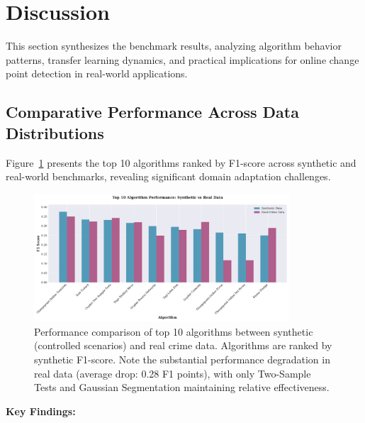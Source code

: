 \section{Discussion}

This section synthesizes the benchmark results, analyzing algorithm behavior patterns, transfer learning dynamics, and practical implications for online change point detection in real-world applications.

\subsection{Comparative Performance Across Data Distributions}

Figure~\ref{fig:top_algorithms_comparison} presents the top 10 algorithms ranked by F1-score across synthetic and real-world benchmarks, revealing significant domain adaptation challenges.

\begin{figure}[H]
\centering
\includegraphics[width=0.85\textwidth]{figures/fig_top_algorithms_comparison.pdf}
\caption{Performance comparison of top 10 algorithms between synthetic (controlled scenarios) and real crime data. Algorithms are ranked by synthetic F1-score. Note the substantial performance degradation in real data (average drop: 0.28 F1 points), with only Two-Sample Tests and Gaussian Segmentation maintaining relative effectiveness.}
\label{fig:top_algorithms_comparison}
\end{figure}

\textbf{Key Findings:}

